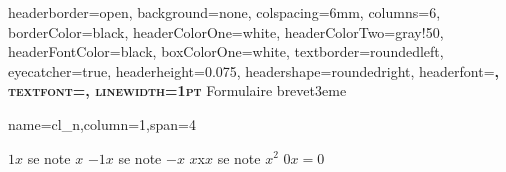 \documentclass[a4paper,margin=1cm,fontscale=1]{baposter} %
\begin{document}
\begin{poster}
{
headerborder=open, %
background=none, 
colspacing=6mm, %
columns=6,
borderColor=black, %
headerColorOne=white, %
headerColorTwo=gray!50, %
headerFontColor=black, %
boxColorOne=white, %
textborder=roundedleft, %
eyecatcher=true, %
headerheight=0.075\textheight, %
headershape=roundedright, %
headerfont=\textsc\bf,%
textfont={\setlength{\parindent}{0em}}, %
linewidth=1pt %
}
{\mbox{}\hspace*{0.5cm}%
} %
{\mbox{}{\Huge Formulaire brevet}}{\footnotesize 3eme} %
{%
}%
% 


{name=cl_n,column=1,span=4}
{
{$1x$ se note $x$}
\hfill{$-1x$ se note $-x$}
\hfill{$x$x$x$ se note $x^{2}$}
\hfill{$0x = 0$}

}


\end{poster}
\end{document}
